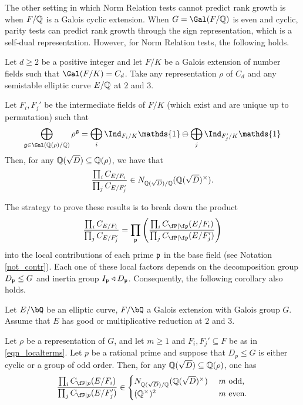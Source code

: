 
The other setting in which Norm Relation tests cannot predict rank growth is when $F/\mathbb{Q}$ is a Galois cyclic extension. When $G=\Gal(F/\QQ)$ is even and cyclic, parity tests can predict rank growth through the sign representation, which is a self-dual representation. However, for Norm Relation tests, the following holds.

\begin{thm}\label{thm_cyclic-cons}
    Let $d\geq2$ be a positive integer and let $F/K$ be a Galois extension of number fields such that $\Gal(F/K)=C_d$. Take any representation $\rho$ of $C_d$ and any semistable elliptic curve $E/\mathbb{Q}$ at $2$ and $3$. 
    
    Let $F_i,F_j'$ be the intermediate fields of $F/K$ (which exist and are unique up to permutation) such that 
    \begin{equation*}%
        \bigoplus_{\mathfrak{g}\in\Gal(\QQ(\rho)/\QQ)}\rho^{\mathfrak{g}}=\bigoplus_i\Ind_{F_i/K}\mathds{1}\ominus\bigoplus_j\Ind_{F'_j/K}\mathds{1}
    \end{equation*}
    Then, for any $\mathbb{Q}(\sqrt{D})\subseteq\mathbb{Q}(\rho)$, we have that
    $$\frac{\prod_i C_{E/F_i}}{\prod_j C_{E/F_j'}}\in N_{\mathbb{Q}(\sqrt{D})/\mathbb{Q}}(\mathbb{Q}(\sqrt{D})^{\times}).$$
\end{thm}

The strategy to prove these results is to break down the product 
$$\frac{\prod_i C_{E/F_i}}{\prod_j C_{E/F_j'}}=\prod_{\pp}\left(\frac{\prod_i \Cp(E/F_i)}{\prod_j \Cp(E/F_j')}\right)$$
into the local contributions of each prime $\mathfrak{p}$ in the base field (see Notation \ref{not_contr}). Each one of these local factors depends on the decomposition group $D_{\mathfrak{p}}\leq G$ and inertia group $I_{\mathfrak{p}}\triangleleft D_{\mathfrak{p}}$. Consequently, the following corollary also holds.

\begin{cor}%
    Let $E / \bQ$ be an elliptic curve, $F / \bQ$ a Galois extension with Galois group $G$. Assume that $E$ has good or multiplicative reduction at $2$ and $3$. 
    
    Let $\rho$ be a representation of $G$, and let $m\geq 1$ and $F_i,F_j'\subseteq F$ be as in \eqref{eqn_localterms}. Let $p$ be a rational prime and suppose that $D_p\leq G$ is either cyclic or a group of odd order. Then, for any $\mathbb{Q}(\sqrt{D})\subseteq\mathbb{Q}(\rho)$, one has
    \[
        \frac{\prod_i C_{\fP\mid p}(E/F_i)}{\prod_j C_{\fP\mid p}(E/F_j')}\in
        \begin{cases}
            N_{\QQ(\sqrt{D})/\QQ}(\QQ(\sqrt{D})^{\times}) & \text{ $m$ odd,}\\ \QQss & \text{ $m$ even.}
        \end{cases}
    \] 
\end{cor}

